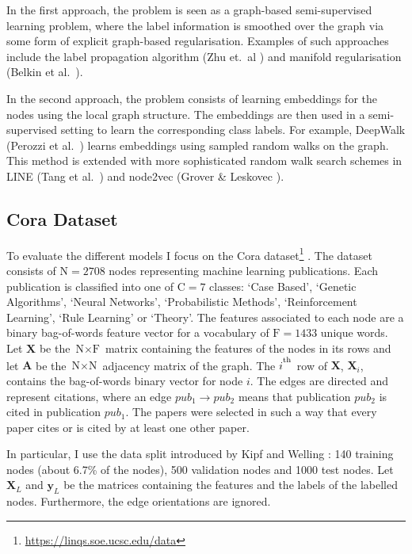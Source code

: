 \documentclass[12pt]{article}
\theoremstyle{definition}
\begin{document}
\bigskip

In the first approach, the problem is seen as a graph-based semi-supervised learning problem, where the label information is smoothed over the graph via some form of explicit graph-based regularisation. Examples of such approaches include the label propagation algorithm (Zhu et.\ al \cite{zhu2002learning}) and manifold regularisation (Belkin et al.\ \cite{belkin2006manifold}).

\bigskip

In the second approach, the problem consists of learning embeddings for the nodes using the local graph structure. The embeddings are then used in a semi-supervised setting to learn the corresponding class labels. For example, DeepWalk (Perozzi et al.\ \cite{perozzi2014deepwalk}) learns embeddings using sampled random walks on the graph. This method is extended with more sophisticated random walk search schemes in LINE (Tang et al.\ \cite{tang2015line}) and node2vec (Grover \& Leskovec \cite{grover2016node2vec}).


\subsection{Cora Dataset}
To evaluate the different models I focus on the Cora dataset\footnote{\url{https://linqs.soe.ucsc.edu/data}} \cite{cora}. The dataset consists of $\textrm{N} = 2708$ nodes representing machine learning publications. Each publication is classified into one of $\textrm{C} = 7$ classes: `Case Based', `Genetic Algorithms', `Neural Networks', `Probabilistic Methods', `Reinforcement Learning', `Rule Learning' or `Theory'. The features associated to each node are a binary bag-of-words feature vector for a vocabulary of $\textrm{F} = 1433$ unique words. Let $\mathbf{X}$ be the $\textrm{N} \times \textrm{F}$ matrix containing the features of the nodes in its rows and let $\mathbf{A}$ be the $\textrm{N} \times \textrm{N}$ adjacency matrix of the graph. The $i^\textsuperscript{th}$ row of $\mathbf{X}$,  $\mathbf{X}_i$, contains the bag-of-words binary vector for node $i$. The edges are directed and represent citations, where an edge $\mathit{pub_1} \to \mathit{pub_2}$ means that publication $\mathit{pub_2}$ is cited in publication $\mathit{pub_1}$. The papers were selected in such a way that every paper cites or is cited by at least one other paper. 

\bigskip

In particular, I use the data split introduced by Kipf and Welling \cite{kipf2017semi}: 140 training nodes (about 6.7\% of the nodes), 500 validation nodes and 1000 test nodes. Let $\mathbf{X}_{L}$ and $\textbf{y}_L$ be the matrices containing the features and the labels of the labelled nodes. Furthermore, the edge orientations are ignored.
\end{document}
